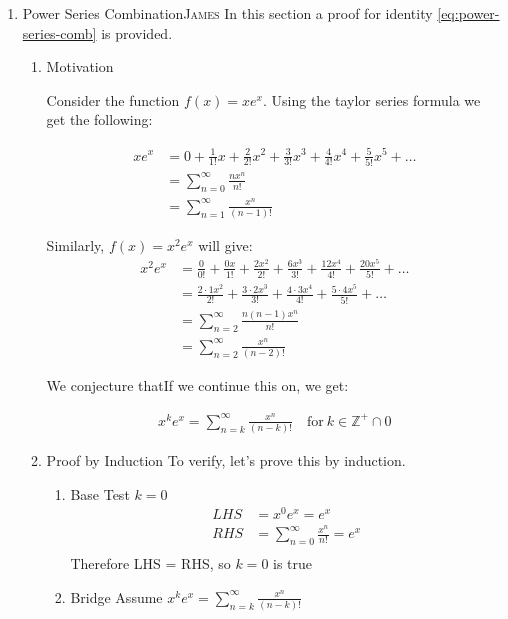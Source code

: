 \documentclass[11pt]{article}
\begin{document}
\begin{enumerate}
\item Power Series Combination\hfill{}\textsc{James}
\label{power-series-comb}
In this section a proof for identity \ref{eq:power-series-comb} is provided.
\begin{enumerate}
\item Motivation
\label{sec:org0cc1c1a}

Consider the function \(f(x) = xe^x\). Using the taylor series formula we get the following:

\begin{align*}
    xe^x &= 0+\frac{1}{1!}x+\frac{2}{2!}x^2+\frac{3}{3!}x^3+\frac{4}{4!}x^4+\frac{5}{5!}x^5+\dots\\
    &= \sum_{n=0}^\infty \frac{nx^n}{n!}\\
    &= \sum_{n=1}^\infty \frac{x^n}{(n-1)!}
\end{align*}

Similarly, \(f(x) = x^2e^x\) will give:
\begin{align*}
    x^2e^x &= \frac{0}{0!} + \frac{0x}{1!} + \frac{2x^2}{2!} + \frac{6x^3}{3!} + \frac{12x^4}{4!} + \frac{20x^5}{5!} + \dots\\
    &= \frac{2\cdot 1x^2}{2!} + \frac{3\cdot 2 x^3}{3!} + \frac{4\cdot 3x^4}{4!} + \frac{5\cdot 4 x^5}{5!} + \dots\\
    &= \sum_{n=2}^\infty \frac{n(n-1)x^n}{n!}\\
    &= \sum_{n=2}^\infty \frac{x^n}{(n-2)!}
\end{align*}

We conjecture thatIf we continue this on, we get:

\begin{align*}
    x^ke^x = \sum_{n=k}^\infty \frac{x^n}{(n-k)!} \quad \text{for}~k\in \mathbb{Z^{+}}\cap0
\end{align*}
\item Proof by Induction
\label{sec:org3684faf}
To verify, let's prove this by induction.
\begin{enumerate}
\item Base
\label{sec:org48f85b1}
Test \(k=0\)
\begin{align*}
    LHS &= x^0e^x = e^x\\
    RHS &= \sum_{n=0}^\infty \frac{x^n}{n!} = e^x\\
\end{align*}
Therefore LHS = RHS, so \(k=0\) is true

\item Bridge
\label{sec:org4ff7cef}
Assume \(x^k e^x = \sum_{n=k}^\infty\frac{x^n}{(n-k)!}\)


\end{enumerate}
\end{enumerate}
\end{enumerate}
\end{document}
